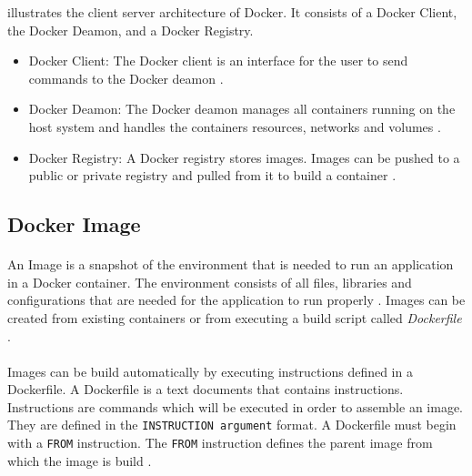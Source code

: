  illustrates the client server architecture of Docker. It consists of a Docker Client, the Docker Deamon, and a Docker Registry.

\begin{itemize}
\item Docker Client: The Docker client is an interface for the user to send commands to the Docker deamon \cite{Docker2020Docs}.

\item Docker Deamon: The Docker deamon manages all containers running on the host system and handles the containers resources, networks and volumes \cite{Bullington2020Docker}.

\item Docker Registry: A Docker registry stores images. Images can be pushed to a public or private registry and pulled from it to build a container \cite{Docker2020Docs}.
\end{itemize}


\subsection{Docker Image}
\label{subsec:04_docker_image}
\paragraph{}
An Image is a snapshot of the environment that is needed to run an application in a Docker container. The environment consists of all files, libraries and configurations that are needed for the application to run properly \cite{Docker2020Docs, Nickoloff2019Docker}.
Images can be created from existing containers or from executing a build script called \textit{Dockerfile} \cite{Nickoloff2019Docker}.


\paragraph{}
Images can be build automatically by executing instructions defined in a Dockerfile.
A Dockerfile is a text documents that contains instructions. Instructions are commands which will be executed in order to assemble an image. They are defined in the \texttt{INSTRUCTION argument} format.
A Dockerfile must begin with a \texttt{FROM} instruction. The \texttt{FROM} instruction defines the parent image from which the image is build \cite{Docker2020Docs}.


